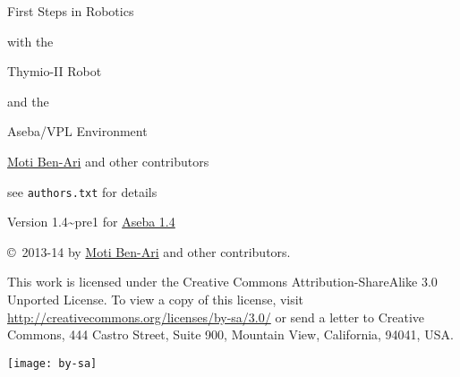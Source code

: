 
\thispagestyle{empty}

\begin{center}
\begin{Huge}
\begin{bfseries}
First Steps in Robotics
\end{bfseries}

with the

\begin{bfseries}
Thymio-II Robot
\end{bfseries}

and the

\begin{bfseries}
Aseba/VPL Environment
\end{bfseries}

\end{Huge}

\vskip 2cm

\begin{LARGE}
\href{http://www.weizmann.ac.il/sci-tea/benari/}{Moti Ben-Ari} and other contributors\\
\end{LARGE}
\bigskip
\begin{Large}
see \texttt{authors.txt} for details
\end{Large}

\vskip 1cm

\begin{Large}
Version 1.4{\textasciitilde}pre1 for \href{https://aseba.wikidot.com/en:downloadinstall}{Aseba 1.4}
\end{Large}

\end{center}

\vfill

\begin{center}
\copyright{}\  2013-14 by \href{http://www.weizmann.ac.il/sci-tea/benari/}{Moti Ben-Ari} and other contributors.
\end{center}

This work is licensed under the Creative Commons
Attribution-ShareAlike 3.0 Unported License. To view a copy
of this license, visit
\url{http://creativecommons.org/licenses/by-sa/3.0/}
or send a letter to Creative Commons, 444 Castro Street, Suite 900,
Mountain View, California, 94041, USA.

\begin{center}
\texttt{[image: by-sa]}
\end{center}

\newpage
\begin{spacing}{0.7}
\tableofcontents
\end{spacing}
\thispagestyle{empty}
\newpage
\setcounter{page}{1}
